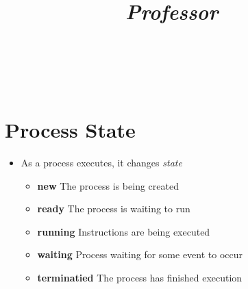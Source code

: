 \documentclass[titlepage]{article}
\title{
  \textmd{\LARGE{\textbf{\noteTitle}}}\\
  \textmd{\Large{\textit{\class}}}\\
  \textmd{\Large{\textit{Professor\ \professor}}}\\
  \textmd{\normalsize{\classTime}}\\
  \vspace{3.5in}
  \textmd{\LARGE{\textbf{\notesAuthor}}}\\
  \date{}
}
\begin{document}
  \maketitle
  \section*{Process State}
  \begin{itemize}
    \item As a process executes, it changes \textit{state}

    \begin{itemize}
      \item \textbf{new} The process is being created
      \item \textbf{ready} The process is waiting to run
      \item \textbf{running} Instructions are being executed
      \item \textbf{waiting} Process waiting for some event to occur
      \item \textbf{terminatied} The process has finished execution
    \end{itemize}
  \end{itemize}
\end{document}
